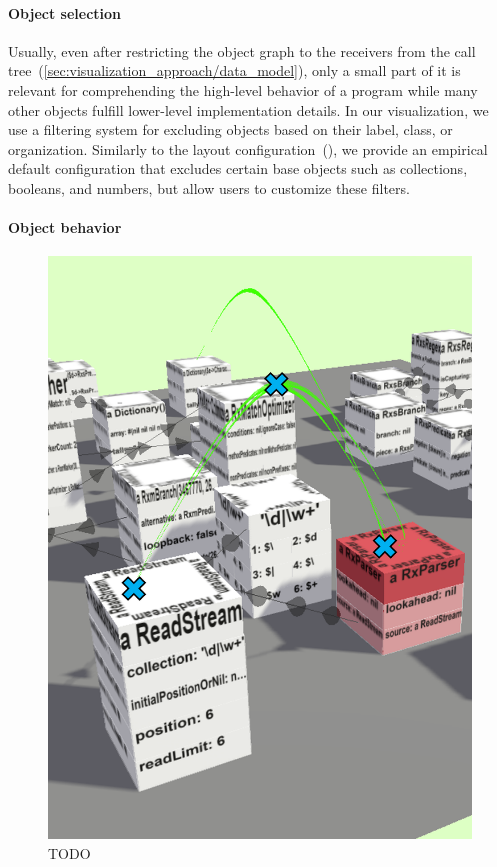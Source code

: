 \paragraph{Object selection}
\label{sec:visualization_approach/mapping/object_selection}

Usually, even after restricting the object graph to the receivers from the call tree~(\cref{sec:visualization_approach/data_model}), only a small part of it is relevant for comprehending the high-level behavior of a program while many other objects fulfill lower-level implementation details.
In our visualization, we use a filtering system for excluding objects based on their label, class, or organization.
Similarly to the layout configuration~(), we provide an empirical default configuration that excludes certain base objects such as collections, booleans, and numbers, but allow users to customize these filters.

\paragraph{Object behavior}
\label{sec:visualization_approach/mapping/object_behavior}

\begin{figure}
	\includegraphics[height=.25\textheight]{sections/03_visualization_approach/mapping/object_behavior}
	\caption{TODO}
	\label{fig:visualization_approach/mapping/object_behavior}
\end{figure}

